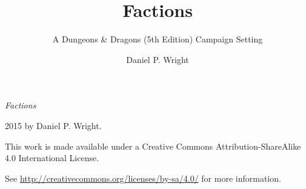 \documentclass[10pt,twoside,openright,a4paper,twocolumn]{memoir}
\title{Factions}
\subtitle{A Dungeons \& Dragons (5th Edition) Campaign Setting}
\author{Daniel P. Wright}
\begin{document}
\begin{titlingpage}
\factionstitle
\end{titlingpage}

\frontmatter

\onecolumn
\thispagestyle{empty}
\null\vfill
\begin{flushleft}
\textit{Factions}

{\textcopyright} 2015 by Daniel P. Wright.

\bigskip

{\ccLogo} {\ccAttribution} {\ccShareAlike}

This work is made available under a Creative Commons Attribution-ShareAlike 4.0 International License.

See \url{http://creativecommons.org/licenses/by-sa/4.0/} for more information.
\end{flushleft}
\twocolumn

\cleartorecto
\setcounter{page}{1}
\tableofcontents

\mainmatter
\end{document}
